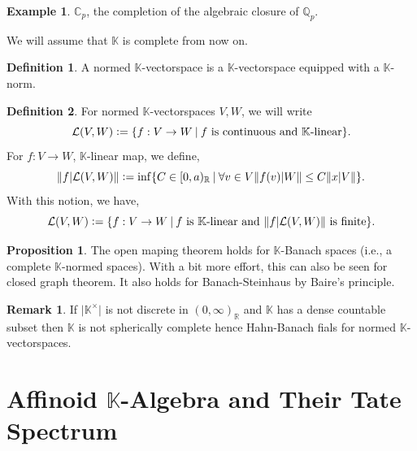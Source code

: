 \documentclass[10pt]{article}
\numberwithin{equation}{section}
\theoremstyle{definition}
\newtheorem{proposition}{Proposition}[subsection]
\newtheorem{definition}{Definition}[subsection]
\newtheorem{remark}{Remark}[subsection]
\newtheorem{example}{Example}[subsection]
\newcommand{\defeq}{\vcentcolon=}
\newcommand{\norm}[1]{\Vert #1 \Vert}
\newcommand{\R}[0]{\mathbb{R}}
\newcommand{\sep}[0]{\:|\:}
\newcommand{\ab}[1]{\vert #1 \vert}
\begin{document}
\begin{example}
    $\mathbb{C}_p$, the completion of the algebraic closure of $\mathbb{Q}_p$.
\end{example}

We will assume that $\mathbb{K}$ is complete from now on.

\begin{definition}
    A normed $\mathbb{K}$-vectorspace is a $\mathbb{K}$-vectorspace equipped with a $\mathbb{K}$-norm.
\end{definition}

\begin{definition}
    For normed $\mathbb{K}$-vectorspaces $V,W$, we will write 
    \begin{equation*}
        \mathcal{L}(V,W)\defeq\{f:V\to W\sep \text{$f$ is continuous and $\mathbb{K}$-linear}\}.
    \end{equation*}
    For $f:V\to W$, $\mathbb{K}$-linear map, we define,
    \begin{equation*}
        \norm{f\vert \mathcal{L}(V,W)} \defeq \inf\{C\in[0,a)_\R\sep\forall v\in V \norm{f(v)\vert W}\leq C\norm{x\vert V}\}.
    \end{equation*}
    With this notion, we have,
    \begin{equation*}
        \mathcal{L}(V,W)\defeq \{f:V\to W\sep \text{$f$ is $\mathbb{K}$-linear and $\norm{f\vert\mathcal{L}(V,W)}$ is finite}\}.
    \end{equation*}
\end{definition}

\begin{proposition}
    The open maping theorem holds for $\mathbb{K}$-Banach spaces (i.e., a complete $\mathbb{K}$-normed spaces). With a bit more effort, this can also be seen for closed graph theorem. It also holds for Banach-Steinhaus by Baire's principle.
\end{proposition}

\begin{remark}
    If $\ab{\mathbb{K}^\times}$ is not discrete in $(0,\infty)_\R$ and $\mathbb{K}$ has a dense countable subset then $\mathbb{K}$ is not spherically complete hence Hahn-Banach fials for normed $\mathbb{K}$-vectorspaces.
\end{remark}

\section{Affinoid $\mathbb{K}$-Algebra and Their Tate Spectrum}
\end{document}
